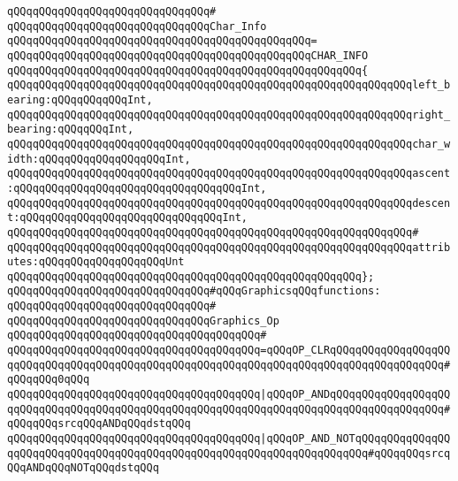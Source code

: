 \verb|qQQqqQQqqQQqqQQqqQQqqQQqqQQqqQQq#|\newline
\verb|qQQqqQQqqQQqqQQqqQQqqQQqqQQqqQQqChar_Info|\newline
\verb|qQQqqQQqqQQqqQQqqQQqqQQqqQQqqQQqqQQqqQQqqQQqqQQq=|\newline
\verb|qQQqqQQqqQQqqQQqqQQqqQQqqQQqqQQqqQQqqQQqqQQqqQQqCHAR_INFO|\newline
\verb|qQQqqQQqqQQqqQQqqQQqqQQqqQQqqQQqqQQqqQQqqQQqqQQqqQQqqQQq{|\newline
\verb|qQQqqQQqqQQqqQQqqQQqqQQqqQQqqQQqqQQqqQQqqQQqqQQqqQQqqQQqqQQqqQQqleft_bearing:qQQqqQQqqQQqInt,|\newline
\verb|qQQqqQQqqQQqqQQqqQQqqQQqqQQqqQQqqQQqqQQqqQQqqQQqqQQqqQQqqQQqqQQqright_bearing:qQQqqQQqInt,|\newline
\verb|qQQqqQQqqQQqqQQqqQQqqQQqqQQqqQQqqQQqqQQqqQQqqQQqqQQqqQQqqQQqqQQqchar_width:qQQqqQQqqQQqqQQqqQQqInt,|\newline
\verb|qQQqqQQqqQQqqQQqqQQqqQQqqQQqqQQqqQQqqQQqqQQqqQQqqQQqqQQqqQQqqQQqascent:qQQqqQQqqQQqqQQqqQQqqQQqqQQqqQQqqQQqInt,|\newline
\verb|qQQqqQQqqQQqqQQqqQQqqQQqqQQqqQQqqQQqqQQqqQQqqQQqqQQqqQQqqQQqqQQqdescent:qQQqqQQqqQQqqQQqqQQqqQQqqQQqqQQqInt,|\newline
\verb|qQQqqQQqqQQqqQQqqQQqqQQqqQQqqQQqqQQqqQQqqQQqqQQqqQQqqQQqqQQqqQQq#|\newline
\verb|qQQqqQQqqQQqqQQqqQQqqQQqqQQqqQQqqQQqqQQqqQQqqQQqqQQqqQQqqQQqqQQqattributes:qQQqqQQqqQQqqQQqqQQqUnt|\newline
\verb|qQQqqQQqqQQqqQQqqQQqqQQqqQQqqQQqqQQqqQQqqQQqqQQqqQQqqQQq};|\newline
\newline
\verb|qQQqqQQqqQQqqQQqqQQqqQQqqQQqqQQq#qQQqGraphicsqQQqfunctions:|\newline
\verb|qQQqqQQqqQQqqQQqqQQqqQQqqQQqqQQq#|\newline
\verb|qQQqqQQqqQQqqQQqqQQqqQQqqQQqqQQqGraphics_Op|\newline
\verb|qQQqqQQqqQQqqQQqqQQqqQQqqQQqqQQqqQQqqQQq#|\newline
\verb|qQQqqQQqqQQqqQQqqQQqqQQqqQQqqQQqqQQqqQQq=qQQqOP_CLRqQQqqQQqqQQqqQQqqQQqqQQqqQQqqQQqqQQqqQQqqQQqqQQqqQQqqQQqqQQqqQQqqQQqqQQqqQQqqQQqqQQqqQQq#qQQqqQQq0qQQq|\newline
\verb|qQQqqQQqqQQqqQQqqQQqqQQqqQQqqQQqqQQqqQQq|\verb#|qQQqOP_ANDqQQqqQQqqQQqqQQqqQQqqQQqqQQqqQQqqQQqqQQqqQQqqQQqqQQqqQQqqQQqqQQqqQQqqQQqqQQqqQQqqQQqqQQq#\verb|#qQQqqQQqsrcqQQqANDqQQqdstqQQq|\newline
\verb|qQQqqQQqqQQqqQQqqQQqqQQqqQQqqQQqqQQqqQQq|\verb#|qQQqOP_AND_NOTqQQqqQQqqQQqqQQqqQQqqQQqqQQqqQQqqQQqqQQqqQQqqQQqqQQqqQQqqQQqqQQqqQQqqQQq#\verb|#qQQqqQQqsrcqQQqANDqQQqNOTqQQqdstqQQq|\newline
